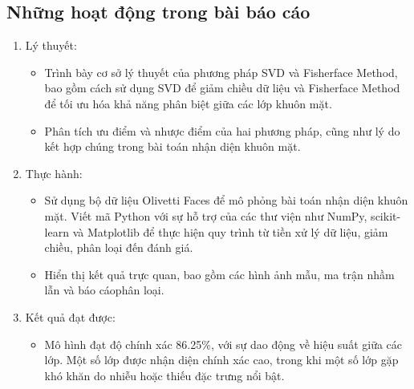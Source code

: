 \documentclass[a4paper,12pt]{extarticle}
\begin{document}
\subsection{Những hoạt động trong bài báo cáo}
\begin{enumerate}
    \item Lý thuyết:
    \begin{itemize}
        \item Trình bày cơ sở lý thuyết của phương pháp SVD và Fisherface Method, bao gồm cách sử dụng SVD để giảm chiều dữ liệu và Fisherface Method để tối ưu hóa khả năng phân biệt giữa các lớp khuôn mặt.
        \item Phân tích ưu điểm và nhược điểm của hai phương pháp, cũng như lý do kết hợp chúng trong bài toán nhận diện khuôn mặt.
    \end{itemize}
    \item Thực hành:
    \begin{itemize}
        \item Sử dụng bộ dữ liệu Olivetti Faces để mô phỏng bài toán nhận diện khuôn mặt. Viết mã Python với sự hỗ trợ của các thư viện như NumPy, scikit-learn và Matplotlib để thực hiện quy trình từ tiền xử lý dữ liệu, giảm chiều, phân loại đến đánh giá.
        \item Hiển thị kết quả trực quan, bao gồm các hình ảnh mẫu, ma trận nhầm lẫn và báo cáophân loại.
    \end{itemize}
    \item Kết quả đạt được:
    \begin{itemize}
        \item Mô hình đạt độ chính xác 86.25\%, với sự dao động về hiệu suất giữa các lớp. Một số lớp được nhận diện chính xác cao, trong khi một số lớp gặp khó khăn do nhiễu hoặc thiếu đặc trưng nổi bật.
    \end{itemize}
\end{enumerate}
\end{document}

